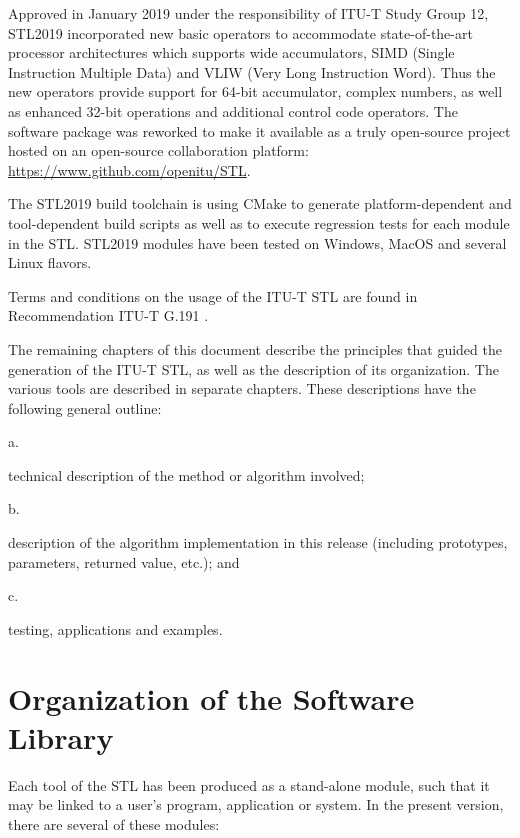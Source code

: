 Approved in January 2019 under the responsibility of ITU-T Study Group 12, STL2019 incorporated new basic operators to accommodate state-of-the-art processor architectures which supports wide accumulators, SIMD (Single Instruction Multiple Data) and VLIW (Very Long Instruction Word).
Thus the new operators provide support for 64-bit accumulator, complex numbers, as well as enhanced 32-bit operations and additional control code operators.
The software package was reworked to make it available as a truly open-source project hosted on an open-source collaboration platform: \url{https://www.github.com/openitu/STL}.

The STL2019 build toolchain is using CMake to generate platform-dependent and tool-dependent build scripts as well as to execute regression tests for each module in the STL.
STL2019 modules have been tested on Windows, MacOS and several Linux flavors.

Terms and conditions on the usage of the ITU-T STL are found in Recommendation ITU-T G.191 \cite{G.191}.

The remaining chapters of this document describe the principles that guided the generation of the ITU-T STL, as well as the description of its organization.
The various tools are described in separate chapters.
These descriptions have the following general outline:

 a. \parbox[t]{140mm}{
               technical description of the method or algorithm involved;}

 b. \parbox[t]{140mm}{
               description of the algorithm implementation in this release (including prototypes, parameters, returned value, etc.); and }

 c. \parbox[t]{140mm}{
               testing, applications and examples.}




\section{Organization of the Software Library}

Each tool of the STL has been produced as a stand-alone module, such
that it may be linked to a user's program, application or system. In
the present version, there are several of these modules:

